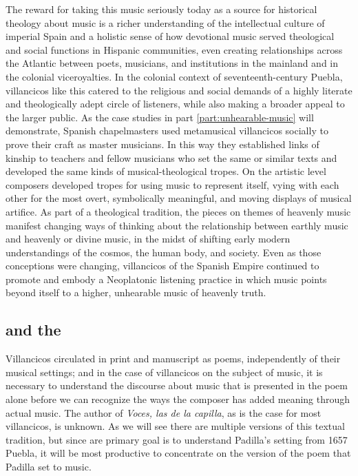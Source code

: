The reward for taking this music seriously today as a source for historical
theology about music is a richer understanding of the intellectual culture of
imperial Spain and a holistic sense of how devotional music served theological
and social functions in Hispanic communities, even creating relationships across
the Atlantic between poets, musicians, and institutions in the mainland and in
the colonial viceroyalties.
In the colonial context of seventeenth-century Puebla, villancicos like this
catered to the religious and social demands of a highly literate and
theologically adept circle of listeners, while also making a broader appeal to
the larger public.
As the case studies in part \ref{part:unhearable-music} will demonstrate,
Spanish chapelmasters used metamusical villancicos socially to prove their craft
as master musicians.
In this way they established links of kinship to teachers and fellow musicians
who set the same or similar texts and developed the same kinds of
musical-theological tropes.
On the artistic level composers developed tropes for using music to represent
itself, vying with each other for the most overt, symbolically meaningful, and
moving displays of musical artifice.
As part of a theological tradition, the pieces on themes of heavenly music
manifest changing ways of thinking about the relationship between earthly music
and heavenly or divine music, in the midst of shifting early modern
understandings of the cosmos, the human body, and society.
Even as those conceptions were changing, villancicos of the Spanish Empire
continued to promote and embody a Neoplatonic listening practice in which music
points beyond itself to a higher, unhearable music of heavenly truth.


\subsection{ and the }

Villancicos circulated in print and manuscript as poems, independently of their
musical settings; and in the case of villancicos on the subject of music, it is
necessary to understand the discourse about music that is presented in the poem
alone before we can recognize the ways the composer has added meaning through
actual music.
The author of \emph{Voces, las de la capilla}, as is the case for most
villancicos, is unknown.
As we will see there are multiple versions of this textual tradition, but since
are primary goal is to understand Padilla's setting from 1657 Puebla, it will be
most productive to concentrate on the version of the poem that Padilla set to
music.

